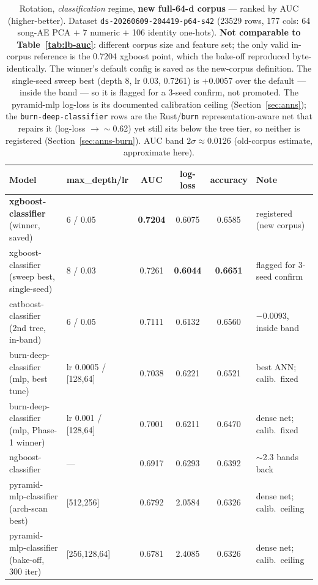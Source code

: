 \documentclass[11pt]{article}
\newcommand{\dsid}[1]{\texttt{\small #1}}
\newcommand{\best}[1]{\textbf{#1}}
\begin{document}
\begin{table}[ht]
  \centering
  \caption{Rotation, \emph{classification} regime, \textbf{new full-64-d
  corpus} --- ranked by AUC (higher-better). Dataset
  \dsid{ds-20260609-204419-p64-s42} (\num{23529} rows, 177 cols: 64 song-AE
  PCA $+$ 7 numeric $+$ 106 identity one-hots). \textbf{Not comparable to
  Table~\ref{tab:lb-auc}}: different corpus size and feature set; the only
  valid in-corpus reference is the \num{0.7204} xgboost point, which the
  bake-off reproduced byte-identically. The winner's default config is saved
  as the new-corpus definition. The single-seed sweep best (depth 8, lr 0.03,
  \num{0.7261}) is $+0.0057$ over the default --- inside the band --- so it is
  flagged for a 3-seed confirm, not promoted. The pyramid-mlp log-loss is its
  documented calibration ceiling (Section~\ref{sec:anns}); the
  \texttt{burn-deep-classifier} rows are the Rust/\texttt{burn}
  representation-aware net that repairs it (log-loss $\to\sim$0.62) yet still
  sits below the tree tier, so neither is registered
  (Section~\ref{sec:anns-burn}). AUC band $2\sigma\approx 0.0126$ (old-corpus
  estimate, approximate here).}
  \label{tab:lb-auc-p64}
  \begin{tabular}{llcccl}
    \toprule
    Model & max\_depth/lr & AUC & log-loss & accuracy & Note \\
    \midrule
    \best{xgboost-classifier} (winner, saved)      & 6 / 0.05  & \best{0.7204} & 0.6075 & 0.6585 & registered (new corpus) \\
    xgboost-classifier (sweep best, single-seed)   & 8 / 0.03  & 0.7261 & \best{0.6044} & \best{0.6651} & flagged for 3-seed confirm \\
    catboost-classifier (2nd tree, in-band)        & 6 / 0.05  & 0.7111 & 0.6132 & 0.6560 & $-0.0093$, inside band \\
    burn-deep-classifier (mlp, best tune)          & lr 0.0005 / [128,64] & 0.7038 & 0.6221 & 0.6521 & best ANN; calib.\ fixed \\
    burn-deep-classifier (mlp, Phase-1 winner)     & lr 0.001 / [128,64]  & 0.7001 & 0.6211 & 0.6470 & dense net; calib.\ fixed \\
    ngboost-classifier                             & ---       & 0.6917 & 0.6293 & 0.6392 & $\sim$2.3 bands back \\
    pyramid-mlp-classifier (arch-scan best)        & [512,256] & 0.6792 & 2.0584 & 0.6326 & dense net; calib.\ ceiling \\
    pyramid-mlp-classifier (bake-off, 300 iter)    & [256,128,64] & 0.6781 & 2.4085 & 0.6326 & dense net; calib.\ ceiling \\
    \bottomrule
  \end{tabular}
\end{table}
\end{document}
